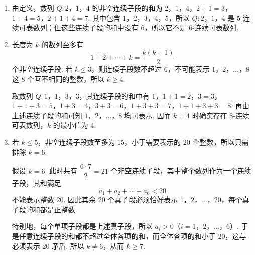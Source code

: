 \begin{solution}
\begin{enumerate}
\item 由定义，数列 \(Q:2\)，\(1\)，\(4\) 的非空连续子段的和为
\(2\)，\(1\)，\(4\)，\(2+1=3\)，\(1+4=5\)，\(2+1+4=7\).
其中包含 \(1\)，\(2\)，\(3\)，\(4\)，\(5\)，所以 \(Q:2\)，\(1\)，\(4\) 是 \(5\)-连续可表数列；但这些连续子段的和中没有 \(6\)，所以它不是 \(6\)-连续可表数列.

\item 长度为 \(k\) 的数列至多有
\[
1+2+\cdots+k=\dfrac{k(k+1)}{2}
\]
个非空连续子段. 若 \(k\leq3\)，则连续子段数不超过 \(6\)，不可能表示 \(1\)，\(2\)，\(\dots\)，\(8\) 这 \(8\) 个互不相同的整数，所以 \(k\geq4\).

取数列 \(Q:1\)，\(1\)，\(3\)，\(3\)，其连续子段的和中有
\(1\)，\(1+1=2\)，\(3=3\)，\(1+1+3=5\)，\(1+3=4\)，\(3+3=6\)，\(1+3+3=7\)，\(1+1+3+3=8\).
再由上述连续子段的和可知 \(1\)，\(2\)，\(\dots\)，\(8\) 均可表示. 因而 \(k=4\) 时确实存在 \(8\)-连续可表数列，\(k\) 的最小值为 \(4\).

\item 若 \(k\leq5\)，非空连续子段数至多为 \(15\)，小于需要表示的 \(20\) 个整数，所以只需排除 \(k=6\).

假设 \(k=6\). 此时共有 \(\dfrac{6\cdot7}{2}=21\) 个非空连续子段，其中整个数列作为一个连续子段，其和满足
\[
a_1+a_2+\cdots+a_6<20
\]
不能表示整数 \(20\). 因此其余 \(20\) 个真子段必须恰好表示 \(1\)，\(2\)，\(\dots\)，\(20\)，每个真子段的和都是正整数.

特别地，每个单项子段都是上述真子段，所以 \(a_i>0\)（\(i=1\)，\(2\)，\(\dots\)，\(6\)）. 于是任意连续子段的和都不超过全体各项的和，而全体各项的和小于 \(20\)，这与必须表示 \(20\) 矛盾. 所以 \(k\ne6\)，从而 \(k\geq7\).
\end{enumerate}
\end{solution}
